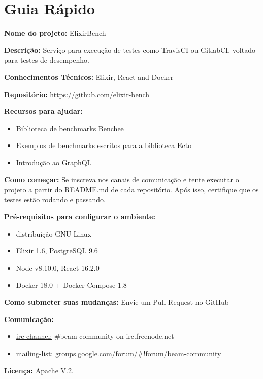 \chapter{Guia Rápido}
\label{cap:guia-rapido}

\noindent
 \textbf{Nome do projeto:} ElixirBench

\noindent
 \textbf{Descrição:} Serviço para execução de testes como TravisCI ou GitlabCI, voltado
 para testes de desempenho.

\noindent
 \textbf{Conhecimentos Técnicos:} Elixir, React and Docker

\noindent
 \textbf{Repositório:} \url{https://github.com/elixir-bench}

\noindent
 \textbf{Recursos para ajudar:}
 \begin{itemize}
   \item \href{https://github.com/PragTob/benchee}{Biblioteca de benchmarks Benchee}
   \item \href{https://github.com/elixir-ecto/ecto/tree/mm/benches/bench}{Exemplos de benchmarks escritos para a biblioteca Ecto}
   \item \href{https://www.howtographql.com/graphql-elixir/0-introduction}{Introdução ao GraphQL}
 \end{itemize}

\noindent
 \textbf{Como começar:} Se inscreva nos canais de comunicação e tente executar
 o projeto a partir do README.md de cada repositório. Após isso, certifique
 que os testes estão rodando e passando.

\noindent
 \textbf{Pré-requisitos para configurar o ambiente:}
 \begin{itemize}
   \item distribuição GNU Linux
   \item Elixir 1.6, PostgreSQL 9.6
   \item Node v8.10.0, React 16.2.0
   \item Docker 18.0 + Docker-Compose 1.8
 \end{itemize}

\noindent
 \textbf{Como submeter suas mudanças:} Envie um Pull Request no GitHub

\noindent
 \textbf{Comunicação:}
 \begin{itemize}
   \item \underline{irc-channel:}  \#beam-community on irc.freenode.net
   \item \underline{mailing-list:} groups.google.com/forum/\#!forum/beam-community
 \end{itemize}

\noindent
 \textbf{Licença:} Apache V.2.
